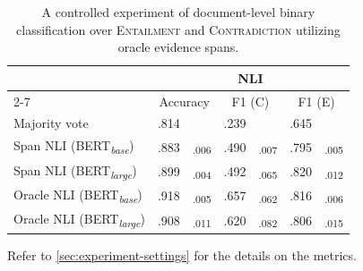 \begin{table}[t]
    \centering
    \begin{threeparttable}
        \centering
        \fontsize{8pt}{10pt}\selectfont
        \setlength{\tabcolsep}{3pt}
        \renewcommand{\arraystretch}{.6}
        \begin{tabular}{lc@{\hskip0pt}cc@{\hskip0pt}cc@{\hskip0pt}c}\toprule
            & \multicolumn{6}{c}{NLI} \\\cmidrule(lr){2-7}
            &  \multicolumn{2}{c}{Accuracy} & \multicolumn{2}{c}{F1 (C)} & \multicolumn{2}{c}{F1 (E)} \\\midrule
            Majority vote & .814 &  & .239 &  & .645 & \\
            Span NLI (BERT\textsubscript{\textit{base}}) & .883 & \textsubscript{.006} & .490 & \textsubscript{.007} & .795 & \textsubscript{.005} \\
            Span NLI (BERT\textsubscript{\textit{large}}) & .899 & \textsubscript{.004} & .492 & \textsubscript{.065} & .820 & \textsubscript{.012} \\
            Oracle NLI (BERT\textsubscript{\textit{base}}) & .918 & \textsubscript{.005} & .657 & \textsubscript{.062} & .816 & \textsubscript{.006} \\
            Oracle NLI  (BERT\textsubscript{\textit{large}}) & .908 & \textsubscript{.011} & .620 & \textsubscript{.082} & .806 & \textsubscript{.015} \\
            \bottomrule
        \end{tabular}
        \makeatletter\def\TPT@hsize{}\makeatletter
        \begin{tablenotes}
            \raggedright
            \fontsize{7pt}{7pt}\selectfont
            Refer to \cref{sec:experiment-settings} for the details on the metrics.
        \end{tablenotes}
    \end{threeparttable}
    \caption{A controlled experiment of document-level binary classification over \textsc{Entailment} and \textsc{Contradiction} utilizing oracle evidence spans.}\label{tab:results-nli_only}
\end{table}
